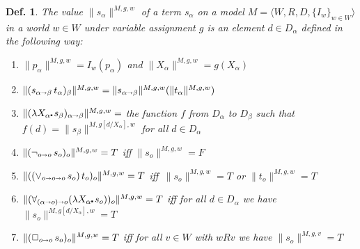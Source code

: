 \documentclass{ecai2014}
\newtheorem{definition}{Def.}
\def\lambdot{\rule{0.6mm}{0.6mm}\hspace{0.4ex}}
\def\lam#1{\lambda #1\lambdot}
\def\modal#1{#1}
\def\mnot{\modal\neg\,}
\def\mor{\,\modal\vee\,}
\def\mball#1{\modal\Box_{#1}\,}
\def\mall#1{\modal{\forall}{#1}\lambdot\,}
\newcommand\entity[1]{\text{\textrm{#1}}}
\def\HOML{\entity{HOML}\xspace}
\def\ar{\shortrightarrow}
\begin{document}


\begin{definition}\label{homlvalue}
The \emph{value} $\| s_\alpha\|^{M,g,w}$ of a \HOML term $s_\alpha$ on a model $M=\langle W, R, D, \{I_w\}_{w\in W}
\rangle$ in a world $w\in W$ under variable assignment $g$ is an element $d\in D_\alpha$ defined in the following way:
\begin{enumerate}
\item $\|p_\alpha\|^{M,g,w} = I_w(p_\alpha)$ and $\|X_\alpha\|^{M,g,w} = g(X_\alpha)$
\item $\|(s_{\alpha\ar\beta}\, t_\alpha)_\beta\|^{M,g,w} = \|s_{\alpha\ar\beta}\|^{M,g,w}(\|t_\alpha\|^{M,g,w})$
\item $\|(\lam{X_\alpha}s_\beta)_{\alpha\ar\beta}\|^{M,g,w} = $ the
  function $f$ from $D_\alpha$ to $D_\beta$ such that $f(d) = \|s_\beta\|^{M,g[d/X_\alpha],w}$ for all $d\in D_\alpha$
\item $\|(\neg_{o\ar o}\, s_o)_o\|^{M,g,w} = T$ iff $\|s_o\|^{M,g,w} = F$
\item $\|(({\vee_{o\ar o\ar o}}\,s_o)\,t_o)_o\|^{M,g,w} = T$ iff \,$\|s_o\|^{M,g,w} = T$ or $\|t_o\|^{M,g,w} = T$
\item $\|(\forall_{(\alpha\ar o)\ar o}(\lam{X_\alpha} s_o))_o\|^{M,g,w} = T$ iff for all $d\in D_\alpha$ we have  $\|s_o\|^{M,g[d/X_\alpha],w}  = T$
\item $\|(\Box_{o\ar o}\, s_o)_o\|^{M,g,w} = T$ iff for all $v \in W$ with $w R v$ we have  $\|s_o\|^{M,g,v}  = T$
\end{enumerate}
\end{definition}
\end{document}
